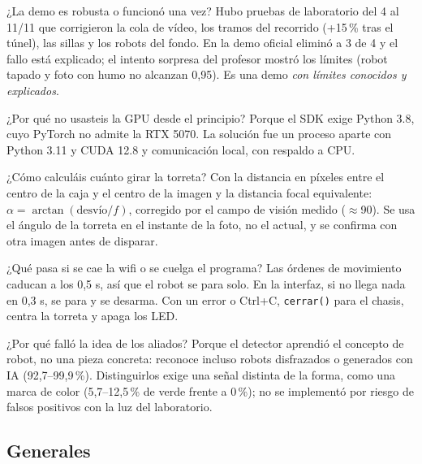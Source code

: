 \documentclass[11pt,a4paper]{article}
\newcommand{\cod}[1]{\texttt{#1}}
\newcommand{\gr}{\textdegree{}}
\begin{document}
\begin{pregunta}{¿La demo es robusta o funcionó una vez?}
Hubo pruebas de laboratorio del 4 al 11/11 que corrigieron la cola de vídeo, los tramos del recorrido (+15\,\% tras el túnel), las sillas y los robots del fondo. En la demo oficial eliminó a 3 de 4 y el fallo está explicado; el intento sorpresa del profesor mostró los límites (robot tapado y foto con humo no alcanzan 0,95). Es una demo \emph{con límites conocidos y explicados}.
\end{pregunta}

\begin{pregunta}{¿Por qué no usasteis la GPU desde el principio?}
Porque el SDK exige Python 3.8, cuyo PyTorch no admite la RTX 5070. La solución fue un proceso aparte con Python 3.11 y CUDA 12.8 y comunicación local, con respaldo a CPU.
\end{pregunta}

\begin{pregunta}{¿Cómo calculáis cuánto girar la torreta?}
Con la distancia en píxeles entre el centro de la caja y el centro de la imagen y la distancia focal equivalente: $\alpha = \arctan(\text{desvío}/f)$, corregido por el campo de visión medido ($\approx$90\gr). Se usa el ángulo de la torreta en el instante de la foto, no el actual, y se confirma con otra imagen antes de disparar.
\end{pregunta}

\begin{pregunta}{¿Qué pasa si se cae la wifi o se cuelga el programa?}
Las órdenes de movimiento caducan a los 0,5 s, así que el robot se para solo. En la interfaz, si no llega nada en 0,3 s, se para y se desarma. Con un error o Ctrl+C, \cod{cerrar()} para el chasis, centra la torreta y apaga los LED.
\end{pregunta}

\begin{pregunta}{¿Por qué falló la idea de los aliados?}
Porque el detector aprendió el concepto de robot, no una pieza concreta: reconoce incluso robots disfrazados o generados con IA (92,7--99,9\,\%). Distinguirlos exige una señal distinta de la forma, como una marca de color (5,7--12,5\,\% de verde frente a 0\,\%); no se implementó por riesgo de falsos positivos con la luz del laboratorio.
\end{pregunta}

\subsection*{Generales}
\end{document}
